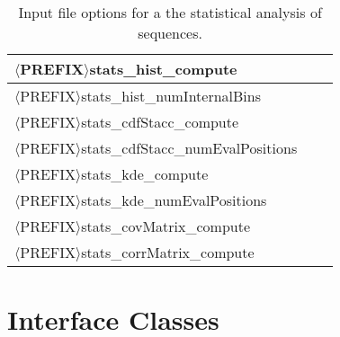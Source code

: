 \begin{table}[!h]
\begin{center}
\begin{tabular}{|l|c|c|}
\hline
\hline
$\langle$PREFIX$\rangle$stats\_hist\_compute              &         &             \\
\hline
$\langle$PREFIX$\rangle$stats\_hist\_numInternalBins      &         &             \\
\hline
\hline
$\langle$PREFIX$\rangle$stats\_cdfStacc\_compute          &         &             \\
\hline
$\langle$PREFIX$\rangle$stats\_cdfStacc\_numEvalPositions &         &             \\
\hline
\hline
$\langle$PREFIX$\rangle$stats\_kde\_compute               &         &             \\
\hline
$\langle$PREFIX$\rangle$stats\_kde\_numEvalPositions      &         &             \\
\hline
\hline
$\langle$PREFIX$\rangle$stats\_covMatrix\_compute         &         &             \\
\hline
$\langle$PREFIX$\rangle$stats\_corrMatrix\_compute        &         &             \\
\hline
\end{tabular}
\end{center}
\caption{
Input file options for a the statistical analysis of sequences.
}
\label{tab-seq-statistical-options}
\end{table}

\clearpage
\section{Interface Classes}
